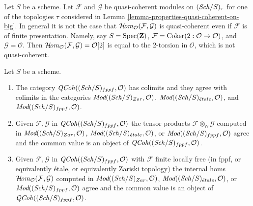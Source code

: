 \begin{example}
\label{example-internal-hom-not-qcoh}
Let $S$ be a scheme. Let $\mathcal{F}$ and $\mathcal{G}$ be quasi-coherent
modules on $(\mathit{Sch}/S)_\tau$ for one of the topologies $\tau$ considered in
Lemma \ref{lemma-properties-quasi-coherent-on-big}.
In general it is not the case that
$\mathop{\mathcal{H}\!\mathit{om}}\nolimits_\mathcal{O}(\mathcal{F}, \mathcal{G})$
is quasi-coherent even if $\mathcal{F}$ is of finite presentation.
Namely, say $S = \mathop{\mathrm{Spec}}(\mathbf{Z})$,
$\mathcal{F} = \mathop{\mathrm{Coker}}(2 : \mathcal{O} \to \mathcal{O})$,
and $\mathcal{G} = \mathcal{O}$. Then
$\mathop{\mathcal{H}\!\mathit{om}}\nolimits_\mathcal{O}(\mathcal{F}, \mathcal{G}) = \mathcal{O}[2]$
is equal to the $2$-torsion in $\mathcal{O}$, which is not quasi-coherent.
\end{example}

\begin{lemma}
\label{lemma-qc-colimits}
Let $S$ be a scheme.
\begin{enumerate}
\item The category $\mathit{QCoh}((\mathit{Sch}/S)_{fppf}, \mathcal{O})$
has colimits and they agree with colimits in the categories
$\textit{Mod}((\mathit{Sch}/S)_{Zar}, \mathcal{O})$,
$\textit{Mod}((\mathit{Sch}/S)_{\acute{e}tale}, \mathcal{O})$, and
$\textit{Mod}((\mathit{Sch}/S)_{fppf}, \mathcal{O})$.
\item Given $\mathcal{F}, \mathcal{G}$ in $\mathit{QCoh}((\mathit{Sch}/S)_{fppf}, \mathcal{O})$
the tensor products $\mathcal{F} \otimes_\mathcal{O} \mathcal{G}$
computed in $\textit{Mod}((\mathit{Sch}/S)_{Zar}, \mathcal{O})$,
$\textit{Mod}((\mathit{Sch}/S)_{\acute{e}tale}, \mathcal{O})$, or
$\textit{Mod}((\mathit{Sch}/S)_{fppf}, \mathcal{O})$ agree and the common value
is an object of $\mathit{QCoh}((\mathit{Sch}/S)_{fppf}, \mathcal{O})$.
\item Given $\mathcal{F}, \mathcal{G}$ in $\mathit{QCoh}((\mathit{Sch}/S)_{fppf}, \mathcal{O})$
with $\mathcal{F}$ finite locally free (in fppf, or equivalently \'etale, or
equivalently Zariski topology) the internal homs
$\mathop{\mathcal{H}\!\mathit{om}}\nolimits_\mathcal{O}(\mathcal{F}, \mathcal{G})$
computed in $\textit{Mod}((\mathit{Sch}/S)_{Zar}, \mathcal{O})$,
$\textit{Mod}((\mathit{Sch}/S)_{\acute{e}tale}, \mathcal{O})$, or
$\textit{Mod}((\mathit{Sch}/S)_{fppf}, \mathcal{O})$ agree and the common value
is an object of $\mathit{QCoh}((\mathit{Sch}/S)_{fppf}, \mathcal{O})$.
\end{enumerate}
\end{lemma}


